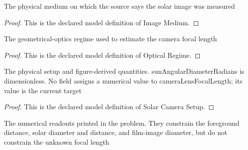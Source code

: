 \begin{definition}
  \label{def:physics:phyx-mini-0153:phyxminiproblems-problemphyxmini0153-imagemedium}
  The physical medium on which the source says the solar image was measured
\end{definition}
\begin{proof}
  This is the declared model definition of Image Medium.
\end{proof}
\begin{definition}
  \label{def:physics:phyx-mini-0153:phyxminiproblems-problemphyxmini0153-opticalregime}
  The geometrical-optics regime used to estimate the camera focal length
\end{definition}
\begin{proof}
  This is the declared model definition of Optical Regime.
\end{proof}
\begin{definition}
  \label{def:physics:phyx-mini-0153:phyxminiproblems-problemphyxmini0153-solarcamerasetup}
  The physical setup and figure-derived quantities. sunAngularDiameterRadians is dimensionless. No field assigns a numerical value to cameraLensFocalLength; its value is the current target
\end{definition}
\begin{proof}
  This is the declared model definition of Solar Camera Setup.
\end{proof}
\begin{definition}
  \label{def:physics:phyx-mini-0153:phyxminiproblems-problemphyxmini0153-matchesstatedmeasurements}
  The numerical readouts printed in the problem. They constrain the foreground distance, solar diameter and distance, and film-image diameter, but do not constrain the unknown focal length
\end{definition}
